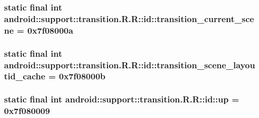 \hypertarget{classandroid_1_1support_1_1transition_1_1_r_1_1id_c520929c6b6ca5b3ca78f8178398d636}{
\subsubsection[{transition\_\-current\_\-scene}]{\setlength{\rightskip}{0pt plus 5cm}static final int android::support::transition.R.R::id::transition\_\-current\_\-scene = 0x7f08000a}}
\label{classandroid_1_1support_1_1transition_1_1_r_1_1id_c520929c6b6ca5b3ca78f8178398d636}


\hypertarget{classandroid_1_1support_1_1transition_1_1_r_1_1id_700078403656c181ee819ffeda9634bc}{
\subsubsection[{transition\_\-scene\_\-layoutid\_\-cache}]{\setlength{\rightskip}{0pt plus 5cm}static final int android::support::transition.R.R::id::transition\_\-scene\_\-layoutid\_\-cache = 0x7f08000b}}
\label{classandroid_1_1support_1_1transition_1_1_r_1_1id_700078403656c181ee819ffeda9634bc}


\hypertarget{classandroid_1_1support_1_1transition_1_1_r_1_1id_af1b4eeda4d5f513e357d3791cf18300}{
\subsubsection[{up}]{\setlength{\rightskip}{0pt plus 5cm}static final int android::support::transition.R.R::id::up = 0x7f080009}}
\label{classandroid_1_1support_1_1transition_1_1_r_1_1id_af1b4eeda4d5f513e357d3791cf18300}


